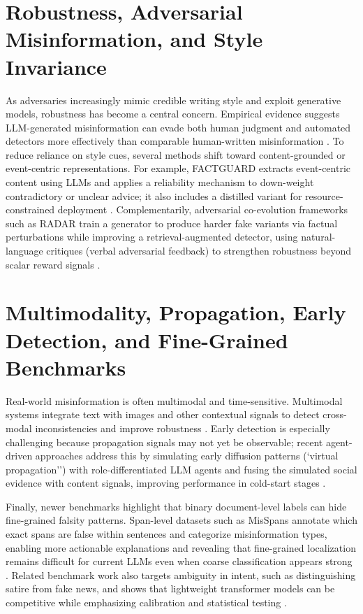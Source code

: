 \section{Robustness, Adversarial Misinformation, and Style Invariance} 

As adversaries increasingly mimic credible writing style and exploit generative models, robustness has become a central concern. Empirical evidence suggests LLM-generated misinformation can evade both human judgment and automated detectors more effectively than comparable human-written misinformation \cite{chen2024llmgeneratedmisinformationdetected}. To reduce reliance on style cues, several methods shift toward content-grounded or event-centric representations. For example, FACTGUARD extracts event-centric content using LLMs and applies a reliability mechanism to down-weight contradictory or unclear advice; it also includes a distilled variant for resource-constrained deployment \cite{he2025factguardeventcentriccommonsenseguidedfake}. Complementarily, adversarial co-evolution frameworks such as RADAR train a generator to produce harder fake variants via factual perturbations while improving a retrieval-augmented detector, using natural-language critiques (verbal adversarial feedback) to strengthen robustness beyond scalar reward signals \cite{ma2026radarretrievalaugmenteddetectoradversarial}. 

\section{Multimodality, Propagation, Early Detection, and Fine-Grained Benchmarks} 

Real-world misinformation is often multimodal and time-sensitive. Multimodal systems integrate text with images and other contextual signals to detect cross-modal inconsistencies and improve robustness \cite{10.1145/3728725.3728739}. Early detection is especially challenging because propagation signals may not yet be observable; recent agent-driven approaches address this by simulating early diffusion patterns (`virtual propagation'') with role-differentiated LLM agents and fusing the simulated social evidence with content signals, improving performance in cold-start stages \cite{gu2026aheadspreadagentdrivenvirtual}. 

Finally, newer benchmarks highlight that binary document-level labels can hide fine-grained falsity patterns. Span-level datasets such as MisSpans annotate which exact spans are false within sentences and categorize misinformation types, enabling more actionable explanations and revealing that fine-grained localization remains difficult for current LLMs even when coarse classification appears strong \cite{liu2026misspansfinegrainedfalsespan}. Related benchmark work also targets ambiguity in intent, such as distinguishing satire from fake news, and shows that lightweight transformer models can be competitive while emphasizing calibration and statistical testing \cite{chhetri2025wisewebinformationsatire}. 

